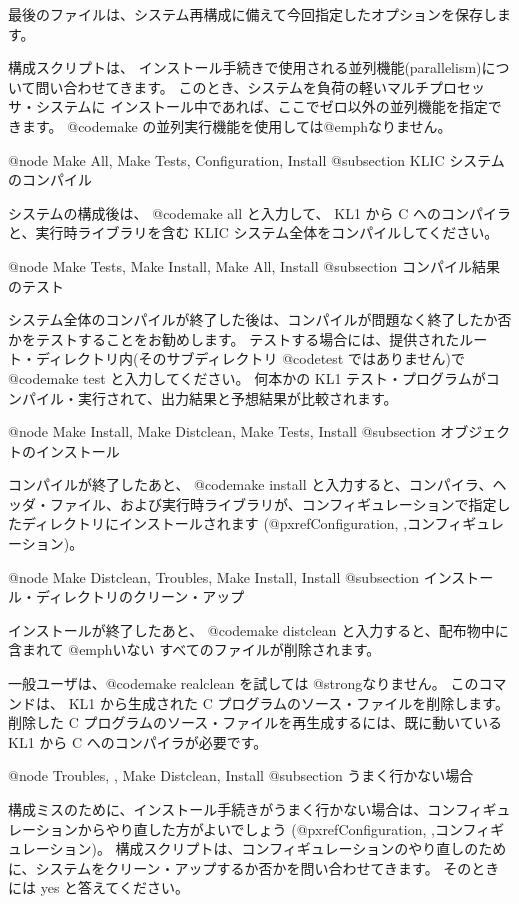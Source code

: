 {{{{最後のファイルは、システム再構成に備えて今回指定したオプションを保存します。

構成スクリプトは、
インストール手続きで使用される並列機能(parallelism)について問い合わせてきます。
このとき、システムを負荷の軽いマルチプロセッサ・システムに
インストール中であれば、ここでゼロ以外の並列機能を指定できます。
 @code{make} の並列実行機能を使用しては@emph{なりません}。

@node Make All, Make Tests, Configuration, Install
@subsection KLIC システムのコンパイル

システムの構成後は、 @code{make all} と入力して、 KL1 から C へのコンパイラと、実行時ライブラリを含む KLIC システム全体をコンパイルしてください。

@node Make Tests, Make Install, Make All, Install
@subsection コンパイル結果のテスト

システム全体のコンパイルが終了した後は、コンパイルが問題なく終了したか否かをテストすることをお勧めします。
テストする場合には、提供されたルート・ディレクトリ内(そのサブディレクトリ @code{test} ではありません)で @code{make test} と入力してください。
何本かの KL1 テスト・プログラムがコンパイル・実行されて、出力結果と予想結果が比較されます。

@node Make Install, Make Distclean, Make Tests, Install
@subsection オブジェクトのインストール

コンパイルが終了したあと、 @code{make install} と入力すると、コンパイラ、ヘッダ・ファイル、および実行時ライブラリが、コンフィギュレーションで指定したディレクトリにインストールされます
(@pxref{Configuration, ,コンフィギュレーション})。

@node Make Distclean, Troubles, Make Install, Install
@subsection インストール・ディレクトリのクリーン・アップ

インストールが終了したあと、 @code{make distclean} と入力すると、配布物中に含まれて @emph{いない} すべてのファイルが削除されます。

一般ユーザは、@code{make realclean} を試しては @strong{なりません}。
このコマンドは、 KL1 から生成された C プログラムのソース・ファイルを削除します。
削除した C プログラムのソース・ファイルを再生成するには、既に動いている KL1 から C へのコンパイラが必要です。

@node Troubles,  , Make Distclean, Install
@subsection うまく行かない場合

構成ミスのために、インストール手続きがうまく行かない場合は、コンフィギュレーションからやり直した方がよいでしょう
(@pxref{Configuration, ,コンフィギュレーション})。
構成スクリプトは、コンフィギュレーションのやり直しのために、システムをクリーン・アップするか否かを問い合わせてきます。
そのときには yes と答えてください。

}}}}
